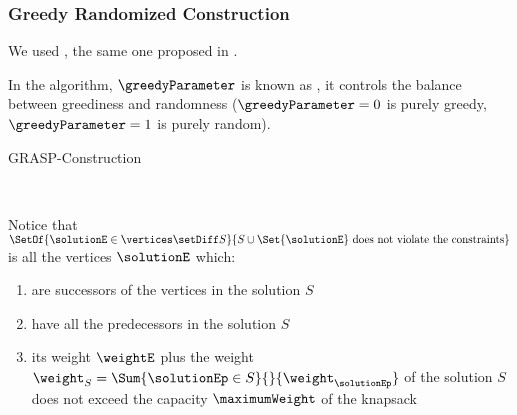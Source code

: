 \subsubsection{Greedy Randomized Construction}
\label{subsubsection:grasp-construction}

We used , the same one proposed in \cite{bib:grasp}.

In the algorithm, $\greedyParameter$ is known as \greedyParameterText, it controls the balance between greediness and randomness ($\greedyParameter = 0$ is purely greedy, $\greedyParameter = 1$ is purely random).

\begin{algorithm}[H]
    \caption{GRASP-Construction}
    \begin{algorithmic}[1]
        \Require{$\greedyParameter$}
        \EndWhile
        \\
    \end{algorithmic}
    \label{algorithm:grasp-construction}
\end{algorithm}

Notice that $\SetOf{\solutionE \in \vertices \setDiff S}{S \cup \Set{\solutionE} \mbox{ does not violate the constraints}}$ is all the vertices $\solutionE$ which:

\begin{enumerate}
    \item are successors of the vertices in the solution $S$
    \item have all the predecessors in the solution $S$
    \item its weight $\weightE$ plus the weight $\weight_{S} = \Sum{\solutionEp \in S}{}{\weight_{\solutionEp}}$ of the solution $S$ does not exceed the capacity $\maximumWeight$ of the knapsack
\end{enumerate}

